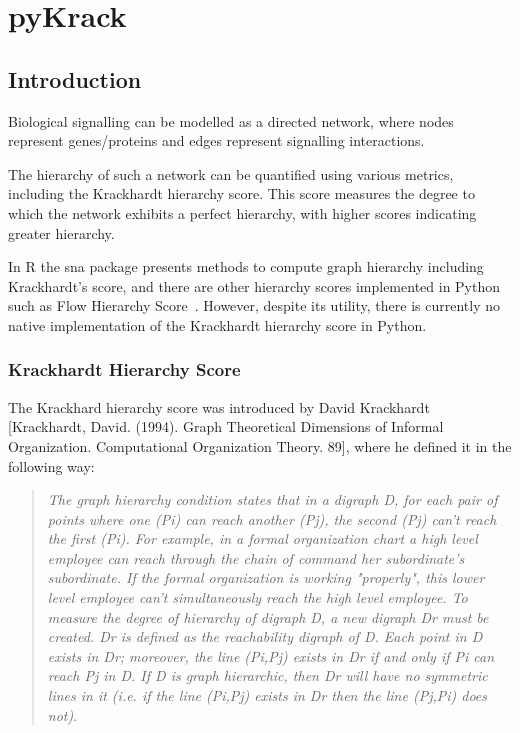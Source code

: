 {}

\appendix

\chapter{pyKrack}
\label{appendix:pykrack}

\section{Introduction}

Biological signalling can be modelled as a directed network, where nodes represent genes/proteins and edges represent signalling interactions.

The hierarchy of such a network can be quantified using various metrics, including the Krackhardt hierarchy score. This score measures the degree to which the network exhibits a perfect hierarchy, with higher scores indicating greater hierarchy.

In R the sna package presents methods to compute graph hierarchy including Krackhardt’s score, and there are other hierarchy scores implemented in Python such as Flow Hierarchy Score~\cite{luo_detecting_2011}. However, despite its utility, there is currently no native implementation of the Krackhardt hierarchy score in Python.

\subsection{Krackhardt Hierarchy Score}

The Krackhard hierarchy score was introduced by David Krackhardt [Krackhardt, David. (1994). Graph Theoretical Dimensions of Informal Organization. Computational Organization Theory. 89], where he defined it in the following way:

\begin{quote}
    \emph{The graph hierarchy condition states that in a digraph D, for each pair of points where one (Pi) can reach another (Pj), the second (Pj) can't reach the first (Pi). 
    For example, in a formal organization chart a high level employee can reach through the chain of command her subordinate's subordinate. If the formal organization is working "properly", this lower level employee can't simultaneously reach the high level employee.
    To measure the degree of hierarchy of digraph D, a new digraph Dr must be created. Dr is defined as the reachability digraph of D. Each point in D exists in Dr; moreover, the line (Pi,Pj) exists in Dr if and only if Pi can reach Pj in D. If D is graph hierarchic, then Dr will have no symmetric lines in it (i.e. if the line (Pi,Pj) exists in Dr then the line (Pj,Pi) does not)}.
\end{quote}

